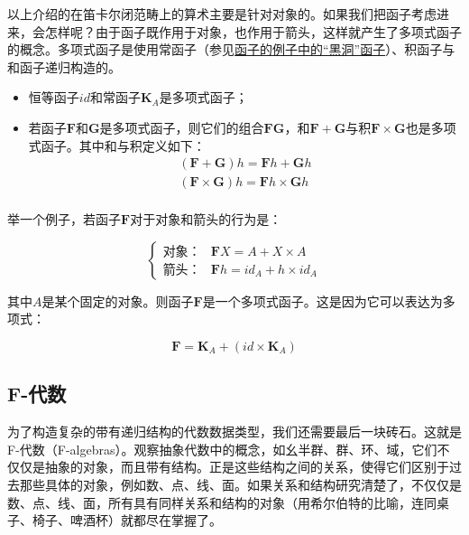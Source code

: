 \documentclass[b5paper]{ctexart}
\begin{document}
以上介绍的在笛卡尔闭范畴上的算术主要是针对对象的。如果我们把函子考虑进来，会怎样呢？由于函子既作用于对象，也作用于箭头，这样就产生了多项式函子的概念。多项式函子是使用常函子（参见\hyperref[sec:functor:examples]{函子的例子中的“黑洞”函子}）、积函子与和函子递归构造的。

\begin{itemize}
  \item 恒等函子$id$和常函子$\mathbf{K}_A$是多项式函子；
  \item 若函子$\mathbf{F}$和$\mathbf{G}$是多项式函子，则它们的组合$\mathbf{FG}$，和$\mathbf{F} + \mathbf{G}$与积$\mathbf{F} \times \mathbf{G}$也是多项式函子。其中和与积定义如下：
  \[
    \begin{array}{l}
    (\mathbf{F} + \mathbf{G}) h = \mathbf{F} h + \mathbf{G} h \\
    (\mathbf{F} \times \mathbf{G}) h = \mathbf{F} h \times \mathbf{G} h \\
    \end{array}
  \]
\end{itemize}

举一个例子，若函子$\mathbf{F}$对于对象和箭头的行为是：

\[
\begin{cases}
\text{对象：} & \mathbf{F} X = A + X \times A \\
\text{箭头：} & \mathbf{F} h = id_A + h \times id_A
\end{cases}
\]

其中$A$是某个固定的对象。则函子$\mathbf{F}$是一个多项式函子。这是因为它可以表达为多项式：

\[
\mathbf{F} = \mathbf{K}_A + (id \times \mathbf{K}_A)
\]

\subsection{F-代数}

为了构造复杂的带有递归结构的代数数据类型，我们还需要最后一块砖石。这就是F-代数（F-algebras）。观察抽象代数中的概念，如幺半群、群、环、域，它们不仅仅是抽象的对象，而且带有结构。正是这些结构之间的关系，使得它们区别于过去那些具体的对象，例如数、点、线、面。如果关系和结构研究清楚了，不仅仅是数、点、线、面，所有具有同样关系和结构的对象（用希尔伯特的比喻，连同桌子、椅子、啤酒杯）就都尽在掌握了。
\end{document}
